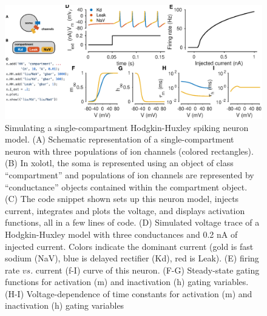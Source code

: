 \documentclass{frontiersSCNS} %
\begin{document}
\FloatBarrier

\newpage



\begin{figure}
	\centering
	\includegraphics[width=1.0\linewidth]{gfx/figure_HH}
	\caption{Simulating a single-compartment Hodgkin-Huxley spiking neuron model. (A) Schematic representation of a single-compartment neuron with three populations of ion channels (colored rectangles). (B) In xolotl, the soma is represented using an object of class ``compartment'' and populations of ion channels are represented by ``conductance'' objects contained within the compartment object. (C) The code snippet shown sets up this neuron model, injects current, integrates and plots the voltage, and displays activation functions, all in a few lines of code. (D) Simulated voltage trace of a Hodgkin-Huxley model with three conductances and 0.2 nA of injected current. Colors indicate the dominant current (gold is fast sodium (NaV), blue is delayed rectifier (Kd), red is Leak). (E) firing rate $vs$. current (f-I) curve of this neuron. (F-G) Steady-state gating functions for activation (m) and inactivation (h) gating variables. (H-I) Voltage-dependence of time constants for activation (m) and inactivation (h) gating variables}
	\label{fig:figurehh}
\end{figure}
\end{document}
